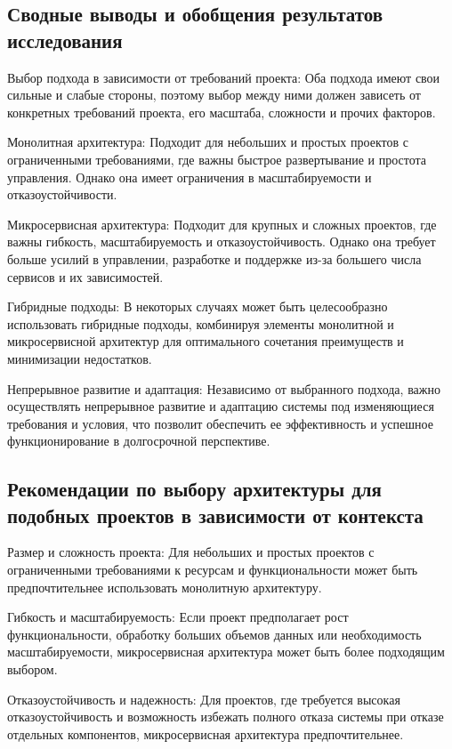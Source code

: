 
\subsection{Сводные выводы и обобщения результатов исследования}
    Выбор подхода в зависимости от требований проекта: Оба подхода имеют свои сильные и слабые стороны, поэтому выбор между ними должен зависеть от конкретных требований проекта, его масштаба, сложности и прочих факторов.

    Монолитная архитектура: Подходит для небольших и простых проектов с ограниченными требованиями, где важны быстрое развертывание и простота управления. Однако она имеет ограничения в масштабируемости и отказоустойчивости.

    Микросервисная архитектура: Подходит для крупных и сложных проектов, где важны гибкость, масштабируемость и отказоустойчивость. Однако она требует больше усилий в управлении, разработке и поддержке из-за большего числа сервисов и их зависимостей.

    Гибридные подходы: В некоторых случаях может быть целесообразно использовать гибридные подходы, комбинируя элементы монолитной и микросервисной архитектур для оптимального сочетания преимуществ и минимизации недостатков.

    Непрерывное развитие и адаптация: Независимо от выбранного подхода, важно осуществлять непрерывное развитие и адаптацию системы под изменяющиеся требования и условия, что позволит обеспечить ее эффективность и успешное функционирование в долгосрочной перспективе.



\subsection{Рекомендации по выбору архитектуры для подобных проектов в зависимости от контекста}

    Размер и сложность проекта: Для небольших и простых проектов с ограниченными требованиями к ресурсам и функциональности может быть предпочтительнее использовать монолитную архитектуру.

    Гибкость и масштабируемость: Если проект предполагает рост функциональности, обработку больших объемов данных или необходимость масштабируемости, микросервисная архитектура может быть более подходящим выбором.

    Отказоустойчивость и надежность: Для проектов, где требуется высокая отказоустойчивость и возможность избежать полного отказа системы при отказе отдельных компонентов, микросервисная архитектура предпочтительнее.

